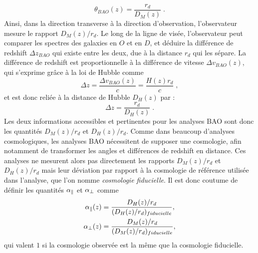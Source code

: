 \documentclass[11pt, twoside, a4paper, openright]{report}
\begin{document}
\begin{equation}
  \label{eq:theta_bao}
  \theta_{BAO}(z) = \frac{r_d}{D_M(z)} \; .
\end{equation}
Ainsi, dans la direction transverse à la direction d'observation, l'observateur mesure le rapport $D_M(z) / r_d$. Le long de la ligne de visée, l'observateur peut comparer les spectres des galaxies en $O$ et en $D$, et déduire la différence de redshift $\Delta z_{BAO}$ qui existe entre les deux, due à la distance $r_d$ qui les sépare. La différence de redshift est proportionnelle à la différence de vitesse $\Delta v_{BAO}(z)$, qui s'exprime grâce à la loi de Hubble comme
\begin{equation}
  \label{eq:v_bao}
\Delta z =  \frac{\Delta v_{BAO}(z)}{c} = \frac{H(z) r_d}{c}  \; ,
\end{equation}
et est donc reliée à la distance de Hubble $D_H(z)$ par :
\begin{equation}
  \label{eq:v_bao2}
  \Delta z = \frac{r_d }{D_H(z)} \; .
\end{equation}
Les deux informations accessibles et pertinentes pour les analyses BAO sont donc les quantités $D_M(z) / r_d$ et $D_H(z) / r_d$. Comme dans beaucoup d'analyses cosmologiques, les analyses BAO nécessitent de supposer une cosmologie, afin notamment de transformer les angles et différences de redshift en distance. Ces analyses ne mesurent alors pas directement les rapports  $D_M(z) / r_d$ et $D_H(z) / r_d$ mais leur déviation par rapport à la cosmologie de référence utilisée dans l'analyse, que l'on nomme \emph{cosmologie fiducielle}. Il est donc coutume de définir les quantités $\alpha_{\parallel}{}$ et $\alpha_{\perp}{}$ comme
\begin{align}
  \label{eq:apar}
  \alpha_{\parallel}{}(z) &= \frac{D_H(z) / r_d}{(D_H(z) / r_d)_{fiducielle}} , \\
  \label{eq:aperp}
  \alpha_{\perp}{}(z) &= \frac{D_M(z) / r_d}{(D_M(z) / r_d)_{fiducielle}} ,
\end{align}
qui valent $1$ si la cosmologie observée est la même que la cosmologie fiducielle.
\end{document}
